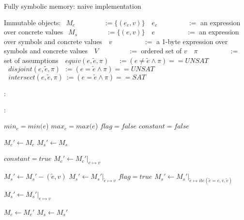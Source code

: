 \documentclass{article}
\begin{document}
\begin{algorithm}
  \normalsize

  \caption{Fully symbolic memory: naive implementation}
  \begin{algorithmic}
  	\State Immutable objects:
  	\State $~~M_c~~~~~~~~~~~~~~~~~~~:= \{(e_c,v)\}$ 
  	\State $~~~e_c~~~~~~~~~~~~~~~~~~~~:=$ an expression over concrete values
  	\State $~~M_s~~~~~~~~~~~~~~~~~~~:= \{(e,v)\}$ 
  	\State $~~~e~~~~~~~~~~~~~~~~~~~\,~:=$ an expression over symbols and concrete values
  	\State $~~~v~~~~~~~~~~~~~~~~~~~~\,:=$ a 1-byte expression over symbols and concrete values
  	\State $~~~V~~~~~~~~~~~~~~~~~~~\,:=$ ordered set of $v$
  	\State $~~~\pi~~~~~~~~~~~~~~~~~~~~\,:=$ set of assumptions
  	\State $~~~equiv(e, \widetilde{e}, \pi)~~~~~\,:= (e \not = \widetilde{e} \wedge \pi) == UNSAT$ 
  	\State $~~~disjoint(e, \widetilde{e}, \pi)~~:=  (e = \widetilde{e} \wedge \pi) == UNSAT$ 
  	\State $~~~intersect(e, \widetilde{e}, \pi)~:=  (e = \widetilde{e} \wedge \pi) == SAT$ 

  \end{algorithmic}

  \bigskip
  
  \begin{algorithmic}[1]
	:
			\State {}
		\EndFor
	\EndFunction
  \end{algorithmic}


  \bigskip

  \begin{algorithmic}[1]
	:
		
		\State $min_e = min(e$)
		\State $max_e = max(e$)
		\State $flag = false$
		\State $constant = false$

		\State ${M_c}' \leftarrow {M_c}$
	    \State ${M_s}' \leftarrow {M_s}$

			\State $constant = true$
			\State ${M_c}' \leftarrow {M_c}'\vert_{e \mapsto v}$
		\EndIf

					\State ${M_s}' \leftarrow {M_s}' - (\widetilde{e}, v)$
				\Else
	    			\State ${M_s}' \leftarrow {M_s}'\vert_{\widetilde{e} \mapsto v}$
	    		\EndIf
	    		\State $flag = true$
	    	\Else
	    		\State ${M_s}' \leftarrow {M_s}'\vert_{\widetilde{e} \mapsto ite(\widetilde{e} = e, v, \widetilde{v})}$
	    	\EndIf
	    \EndFor

	    	\State ${M_s}' \leftarrow {M_s}'\vert_{e \mapsto v}$
	    \EndIf

	    \State ${M_c} \leftarrow {M_c}'$
	    \State ${M_s} \leftarrow {M_s}'$
	\EndFunction
  \end{algorithmic}

\end{algorithm}
  
\end{document}
